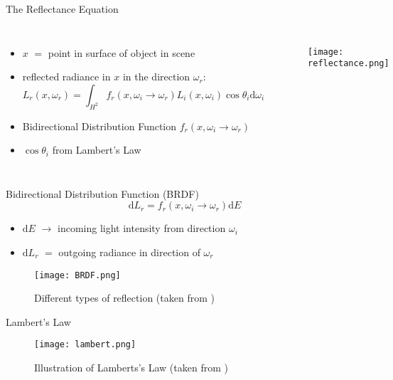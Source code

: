 \begin{frame}{The Reflectance Equation}
\begin{columns}
\begin{itemize}
    \item<1-> $x$ $=$ point in surface of object in scene
    \item<2-> reflected radiance in $x$ in the direction $\omega_r$: 
    \begin{equation}
L_r(x, \omega_r) = \int_{H^2} f_r(x, \omega_i \rightarrow \omega_r) L_i(x, \omega_i) \cos \theta_i \mathrm{d}\omega_i
\end{equation}
    \item<4-> Bidirectional Distribution Function $f_r(x, \omega_i \rightarrow \omega_r) $
    \item<4-> $\cos \theta_i$ from Lambert's Law
\end{itemize}
\begin{figure}
\texttt{[image: reflectance.png]}
\end{figure}
\end{columns}
\end{frame}

\begin{frame}{Bidirectional Distribution Function (BRDF)}
\begin{equation}
\mathrm{d}L_r = f_r(x, \omega_i \rightarrow \omega_r) \mathrm{d}E
\end{equation}
\begin{itemize}
	\pause
    \item  $\mathrm{d}E$ $\rightarrow$ incoming light intensity from direction $\omega_i$ 
    \pause
    \item $\mathrm{d}L_r$ $=$ outgoing radiance in direction of $\omega_r$
    \pause
\end{itemize}
\begin{center}
\begin{figure}
\texttt{[image: BRDF.png]}
\caption{Different types of reflection (taken from \cite{Bungartz.2014})}
\end{figure}
\end{center}
\end{frame}

\begin{frame}{Lambert's Law}
\begin{center}
\begin{figure}
    \texttt{[image: lambert.png]}
    \caption{Illustration of Lamberts's Law (taken from \cite{Pharr.2023})}
\end{figure}
\end{center}
\end{frame}

